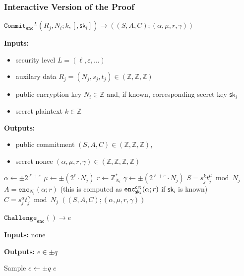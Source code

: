 \documentclass[11pt]{article}
\def\crt{{\sf crt}}
\newenvironment{inlineAlgorithm}{}{}
\newcommand{\algoName}[1]{#1 \par}
\newcommand{\algoInputs}[1]{
    {\small \bf Inputs:} #1 \par
}
\newcommand{\algoInputsList}[1]{
    {\small \bf Inputs:} 
        \begin{itemize}[noitemsep,topsep=0pt]
            #1
        \end{itemize}
}
\newcommand{\algoOutputs}[1]{
    {\small \bf Outputs:} #1 \par
}
\newcommand{\algoOutputsList}[1]{
    {\small \bf Outputs:}
        \begin{itemize}[noitemsep,topsep=0pt]
            #1
        \end{itemize}
}
\newcommand{\enc}{\ensuremath{\mathtt{enc}}}
\newcommand{\commit}[1]{\ensuremath{\mathtt{Commit}_{\mathtt{#1}}}}
\newcommand{\challenge}[1]{\ensuremath{\mathtt{Challenge}_{\mathtt{#1}}}}
\newcommand{\sk}{\textsf{sk}}
\newcommand{\Z}{\mathbb{Z}}
\newcommand{\?}[1]{\stackrel{?}{#1}}
\begin{document}
\subsubsection{Interactive Version of the Proof}

\begin{description}

\item
\begin{inlineAlgorithm}
\algoName{$\commit{enc}^L(R_j, N_i; k, [, \sk_i]) \to ((S, A, C); (\alpha, \mu, r, \gamma))$}
\algoInputsList{
    \item security level $L = (\ell, \varepsilon, \dots)$
    \item auxilary data $R_j = (N_j, s_j, t_j) \in (\Z, \Z, \Z)$
    \item public encryption key $N_i \in \Z$ and, if known, corresponding secret key $\sk_i$
    \item secret plaintext $k \in \Z$
}
\algoOutputsList{
    \item public commitment $(S, A, C) \in (\Z, \Z, \Z)$,
    \item secret nonce $(\alpha, \mu, r, \gamma) \in (\Z, \Z, \Z, \Z)$
}
\begin{algorithmic}[1]
\State $\alpha \gets \pm 2^{\ell + \varepsilon}$
\State $\mu \gets \pm (2^\ell \cdot N_j)$
\State $r \gets \Z_{N_i}^*$
\State $\gamma \gets \pm (2^{\ell + \varepsilon} \cdot N_j)$
\Statex
\State $S = s_j^k t_j^\mu \bmod N_j$ 
\State $A = \enc_{N_i}(\alpha; r)$  (this is computed as $\enc^\crt_{\sk_i}(\alpha; r)$ if $\sk_i$ is known)
\State $C = s_j^\alpha t_j^\gamma \bmod N_j$ 
\State \Return $((S, A, C); (\alpha, \mu, r, \gamma))$
\end{algorithmic}
\end{inlineAlgorithm}

\item
\begin{inlineAlgorithm}
\algoName{$\challenge{enc}() \to e$}
\algoInputs{none}
\algoOutputs{$e \in \pm q$}
\begin{algorithmic}[1]
\State Sample $e \gets \pm q$
\State \Return $e$
\end{algorithmic}


\end{inlineAlgorithm}
\end{description}
\end{document}
